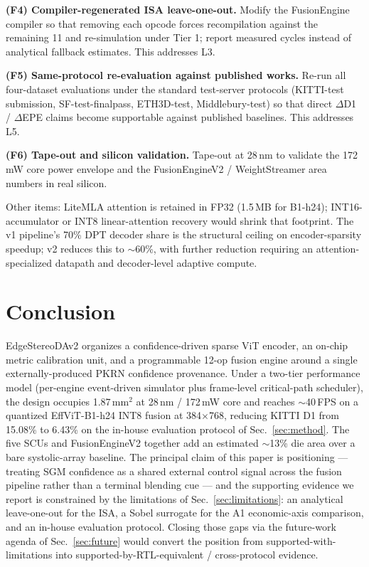 \documentclass[journal]{IEEEtran}
\begin{document}
\textbf{(F4) Compiler-regenerated ISA leave-one-out.}
Modify the FusionEngine compiler so that removing each opcode forces recompilation against the remaining 11 and re-simulation under Tier 1; report measured cycles instead of analytical fallback estimates. This addresses L3.

\textbf{(F5) Same-protocol re-evaluation against published works.}
Re-run all four-dataset evaluations under the standard test-server protocols (KITTI-test submission, SF-test-finalpass, ETH3D-test, Middlebury-test) so that direct $\Delta$D1 / $\Delta$EPE claims become supportable against published baselines. This addresses L5.

\textbf{(F6) Tape-out and silicon validation.}
Tape-out at 28\,nm to validate the 172\,mW core power envelope and the FusionEngineV2 / WeightStreamer area numbers in real silicon.

Other items: LiteMLA attention is retained in FP32 (1.5\,MB for B1-h24); INT16-accumulator or INT8 linear-attention recovery would shrink that footprint. The v1 pipeline's 70\% DPT decoder share is the structural ceiling on encoder-sparsity speedup; v2 reduces this to $\sim$60\%, with further reduction requiring an attention-specialized datapath and decoder-level adaptive compute.

\section{Conclusion}
\label{sec:conclusion}
EdgeStereoDAv2 organizes a confidence-driven sparse ViT encoder, an on-chip metric calibration unit, and a programmable 12-op fusion engine around a single externally-produced PKRN confidence provenance. Under a two-tier performance model (per-engine event-driven simulator plus frame-level critical-path scheduler), the design occupies 1.87\,mm$^2$ at 28\,nm / 172\,mW core and reaches $\sim$40\,FPS on a quantized EffViT-B1-h24 INT8 fusion at 384$\times$768, reducing KITTI D1 from 15.08\% to 6.43\% on the in-house evaluation protocol of Sec.~\ref{sec:method}. The five SCUs and FusionEngineV2 together add an estimated $\sim$13\% die area over a bare systolic-array baseline. The principal claim of this paper is positioning --- treating SGM confidence as a shared external control signal across the fusion pipeline rather than a terminal blending cue --- and the supporting evidence we report is constrained by the limitations of Sec.~\ref{sec:limitations}: an analytical leave-one-out for the ISA, a Sobel surrogate for the A1 economic-axis comparison, and an in-house evaluation protocol. Closing those gaps via the future-work agenda of Sec.~\ref{sec:future} would convert the position from supported-with-limitations into supported-by-RTL-equivalent / cross-protocol evidence.
\end{document}
